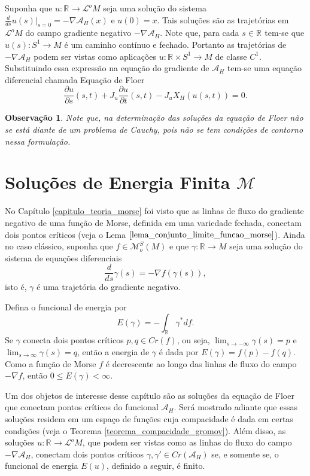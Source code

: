 \documentclass[12pt]{book}
\newtheorem{observacao}[teorema]{Observação}
\newcommand{\circulo}{S^{1}}
\newcommand{\derivada}[2]{\frac{d #1}{d #2}}
\newcommand{\derivadaparcial}[2]{\frac{\partial #1}{\partial #2}}
\newcommand{\energiafinitaM}{\mathcal{M}}
\newcommand{\funcionalH}{\mathcal{A}_{H}}
\newcommand{\funcoesmorsesmale}[1]{\mathcal{M}^{S}_{o}(#1)}
\newcommand{\gradiente}{\nabla f}
\newcommand{\gradientefuncional}{\nabla \funcionalH}
\newcommand{\operadorFloerDefParametros}[1]{\derivadaparcial{#1}{s}(s,t) + J_{#1}\derivadaparcial{#1}{t}(s,t) - J_{#1}X_{H}(#1(s,t))}
\newcommand{\pontoscriticos}[1]{\textit{Cr}(#1)}
\newcommand{\retacartesianocirculo}{\real{} \times \circulo}
\newcommand{\real}[1]{\mathbb{R}^{#1}}
\newcommand{\reta}{\real{}}
\newcommand{\lacocontrateis}{\mathcal{L}^{o}M}
\begin{document}
	Suponha que $u :\reta\to \lacocontrateis$ seja uma solução do sistema $\derivada{}{s}u(s)|_{s=0} = -\gradientefuncional(x)$ e $u(0)=x$. Tais soluções são as trajetórias em $\lacocontrateis$ do campo gradiente negativo $-\gradientefuncional$. Note que, para cada $s\in \reta$ tem-se que $u(s):\circulo\to M$ é um caminho contínuo e fechado. Portanto as trajetórias de $-\gradientefuncional$ podem ser vistas como aplicações $u:\retacartesianocirculo \to M$ de classe $C^{1}$. Substituindo essa expressão na equação do gradiente de $\funcionalH$ tem-se uma equação diferencial chamada Equação de Floer
	$$
	\operadorFloerDefParametros{u}=0.
	$$

	\begin{observacao}
		Note que, na determinação das soluções da equação de Floer não se está diante de um problema de Cauchy, pois não se tem condições de contorno nessa formulação.
	\end{observacao}
	
	\section{Soluções de Energia Finita $\energiafinitaM$}\label{secao_funcional_energia}
	
	No Capítulo \ref{capitulo_teoria_morse} foi visto que as linhas de fluxo do gradiente negativo de uma função de Morse, definida em uma variedade fechada, conectam dois pontos críticos (veja o Lema $\ref{lema_conjunto_limite_funcao_morse}$). Ainda no caso clássico, suponha que $f \in \funcoesmorsesmale{M}$ e que $\gamma:\reta \to M$ seja uma solução do sistema de equações diferenciais
	$$
	\derivada{}{s}\gamma(s)=-\gradiente(\gamma(s)),
	$$
	isto é, $\gamma$ é uma trajetória do gradiente negativo.
	
	Defina o funcional de energia por
	$$
	E(\gamma)= -\int_{\reta}\gamma^{*} df.
	$$
	Se $\gamma$ conecta dois pontos críticos $p,q\in \pontoscriticos{f}$, ou seja, $\lim_{s\to -\infty}\gamma(s)=p$ e $\lim_{s\to \infty}\gamma(s)=q$, então a energia de $\gamma$ é dada por $E(\gamma) = f(p) -f(q)$. Como a função de Morse $f$ é decrescente ao longo das linhas de fluxo do campo $-\gradiente$, então $0\leq E(\gamma)<\infty$.
	
	Um dos objetos de interesse desse capítulo são as soluções da equação de Floer que conectam pontos críticos do funcional $\funcionalH$. Será mostrado adiante que essas soluções residem em um espaço de funções cuja compacidade é dada em certas condições (veja o Teorema \ref{teorema_compacidade_gromov}). Além disso, as soluções $u:\reta\to \lacocontrateis$, que podem ser vistas como as linhas do fluxo do campo $-\gradientefuncional$, conectam dois pontos críticos $\gamma, \gamma'\in \pontoscriticos{\funcionalH}$ se, e somente se, o funcional de energia $E(u)$, definido a seguir, é finito.
	
\end{document}
